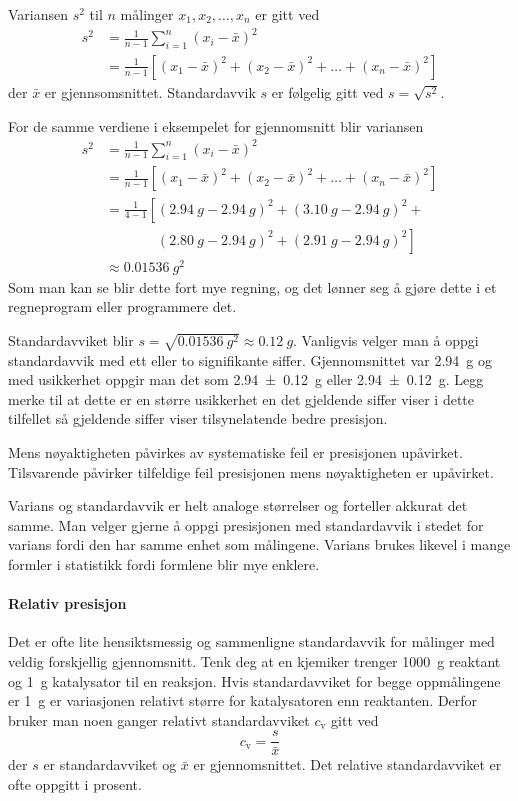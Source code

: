 \documentclass[hidelinks,12pt,norsk,a4paper,fleqn]{scrartcl}
\begin{document}
	Variansen $s^2$ til $n$ målinger $x_1, x_2, \ldots, x_n$ er gitt ved
	\begin{align*}
		s^2 &= \frac{1}{n-1}\sum_{i=1}^{n}(x_i - \bar{x})^2 \\
		&=\frac{1}{n-1}\left[(x_1-\bar{x})^2 + (x_2-\bar{x})^2 + \dots + (x_n-\bar{x})^2\right]
	\end{align*}
	der $\bar{x}$ er gjennsomsnittet. Standardavvik $s$ er følgelig gitt ved	$s=\sqrt{s^2}$.

	For de samme verdiene i eksempelet for gjennomsnitt blir variansen
	\begin{align*}
		s^2 &= \frac{1}{n-1}\sum_{i=1}^{n}(x_i - \bar{x})^2 \\
		&=\frac{1}{n-1}\left[(x_1-\bar{x})^2 + (x_2-\bar{x})^2 + \dots + (x_n-\bar{x})^2\right]\\
		&=\frac{1}{4-1}\left[(\SI{2.94}{g}-\SI{2.94}{g})^2 + ( \SI{3.10}{g}-\SI{2.94}{g})^2\right. + \\
		&\phantom{=\frac{1}{4-1}\left[\right.}\left.  (\SI{2.80}{g}-\SI{2.94}{g})^2 + (\SI{2.91}{g}-\SI{2.94}{g})^2\right]\\
		&\approx \SI{0.01536}{g^2}
	\end{align*}
	Som man kan se blir dette fort mye regning, og det lønner seg å gjøre dette i et regneprogram eller programmere det.
	
	Standardavviket blir $s=\sqrt{\SI{0.01536}{g^2}}\approx\SI{0.12}{g}$. Vanligvis velger man å oppgi standardavvik med ett eller to signifikante siffer. Gjennomsnittet var \SI{2.94}{g} og med usikkerhet oppgir man det som \SI{2.94 +- 0.12}{g} eller \SI[separate-uncertainty=true]{2.94 +- 0.12}{g}. Legg merke til at dette er en større usikkerhet en det gjeldende siffer viser i dette tilfellet så gjeldende siffer viser tilsynelatende bedre presisjon.
	
	Mens nøyaktigheten påvirkes av systematiske feil er presisjonen upåvirket. Tilsvarende påvirker tilfeldige feil presisjonen mens nøyaktigheten er upåvirket.
	
	Varians og standardavvik er helt analoge størrelser og forteller akkurat det samme. Man velger gjerne å oppgi presisjonen med standardavvik i stedet for varians fordi den har samme enhet som målingene. Varians brukes likevel i mange formler i statistikk fordi formlene blir mye enklere.
	
	\paragraph{Relativ presisjon}
	Det er ofte lite hensiktsmessig og sammenligne standardavvik for målinger med veldig forskjellig gjennomsnitt. Tenk deg at en kjemiker trenger \SI{1000}{g} reaktant og \SI{1}{g} katalysator til en reaksjon. Hvis standardavviket for begge oppmålingene er \SI{1}{g} er variasjonen relativt større for katalysatoren enn reaktanten. Derfor bruker man noen ganger relativt standardavviket $c_\mathrm{v}$ gitt ved
	\begin{equation*}
		c_\mathrm{v}=\frac{s}{\bar{x}}
	\end{equation*}
	der $s$ er standardavviket og $\bar{x}$ er gjennomsnittet. Det relative standardavviket er ofte oppgitt i prosent.
		
\end{document}
